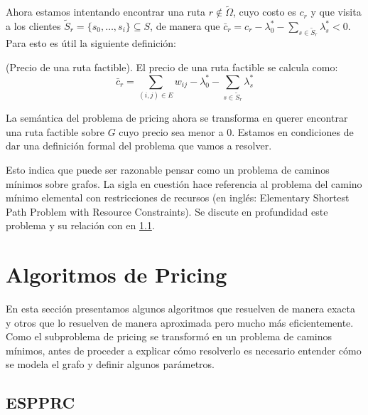 Ahora estamos intentando encontrar una ruta $r \notin \tilde{\Omega}$, cuyo costo es $c_r$ y que visita a los clientes $\tilde{S}_r = \{s_0, \dots, s_i\} \subseteq S$, de manera que $\bar{c}_r = c_r - \lambda^*_0 - \sum_{s \in \tilde{S}_r}{\lambda^*_s} < 0$. Para esto es útil la siguiente definición:

\begin{definition}
    (Precio de una ruta factible).
    El precio de una ruta factible se calcula como: 
    \begin{equation}
        \bar{c}_r = \sum_{(i, j) \in E}{w_{ij}} - \lambda^*_0 - \sum_{s \in \tilde{S}_r}{\lambda^*_s}
    \end{equation}
\end{definition}

La semántica del problema de pricing ahora se transforma en querer encontrar una ruta factible sobre $G$ cuyo precio sea menor a $0$. Estamos en condiciones de dar una definición formal del problema que vamos a resolver. 

\label{star-pricing}

Esto indica que puede ser razonable pensar  como un problema de caminos mínimos sobre grafos. La sigla en cuestión hace referencia al problema del camino mínimo elemental con restricciones de recursos (en inglés: Elementary Shortest Path Problem with Resource Constraints). Se discute en profundidad este problema y su relación con  en \ref{section:espprc}.


\section{Algoritmos de Pricing}
\label{section:pricing-algorithms}

En esta sección presentamos algunos algoritmos que resuelven  de manera exacta y otros que lo resuelven de manera aproximada pero mucho más eficientemente. Como el subproblema de pricing se transformó en un problema de caminos mínimos, antes de proceder a explicar cómo resolverlo es necesario entender cómo se modela el grafo y definir algunos parámetros.


\subsection{ESPPRC}
\label{section:espprc}

